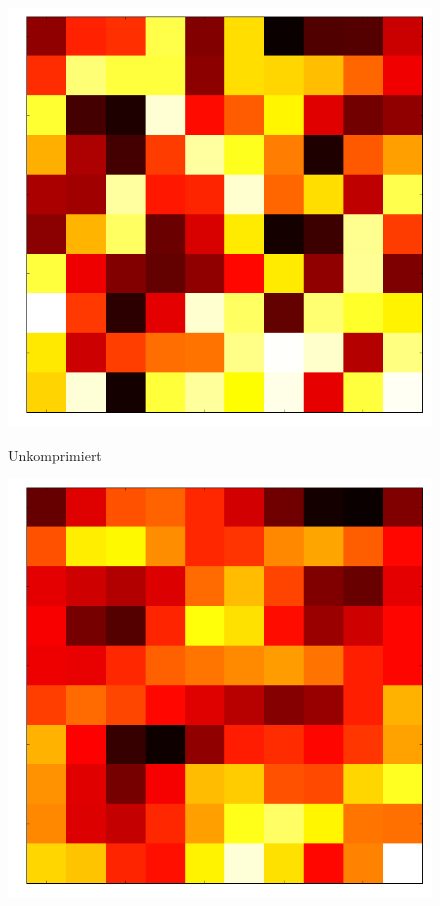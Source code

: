             \begin{multicols}{2}
                \begin{figure}[H]
                    \begin{center}
                        \includegraphics[scale=0.2]{../pictures/DCT-pre.png}\\
                        \caption{Unkomprimiert}\label{fig:dct-pre}
                    \end{center}
                \end{figure}
                \par
                \begin{figure}[H]
                    \begin{center}
                        \includegraphics[scale=0.2]{../pictures/DCT-after.png}\\

\end{center}
\end{figure}
\end{multicols}
